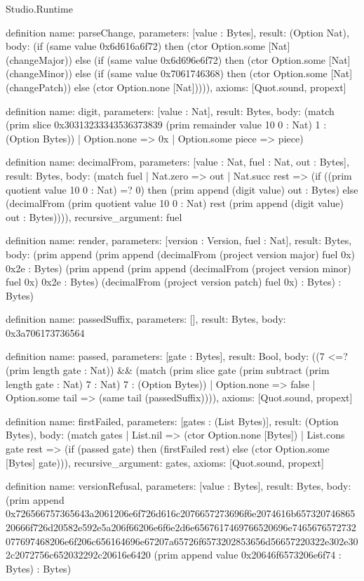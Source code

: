\begin{lexlean}{Studio.Runtime}
\begin{semanticmodule}
definition{
  name: parseChange,
  parameters: [value : Bytes],
  result: (Option Nat),
  body: (if (same value 0x6d616a6f72) then (ctor Option.some [Nat] (changeMajor)) else (if (same value 0x6d696e6f72) then (ctor Option.some [Nat] (changeMinor)) else (if (same value 0x7061746368) then (ctor Option.some [Nat] (changePatch)) else (ctor Option.none [Nat])))),
  axioms: [Quot.sound, propext]
}

definition{
  name: digit,
  parameters: [value : Nat],
  result: Bytes,
  body: (match (prim slice 0x30313233343536373839 (prim remainder value 10 0 : Nat) 1 : (Option Bytes))
    | Option.none => 0x
    | Option.some piece => piece)
}

definition{
  name: decimalFrom,
  parameters: [value : Nat, fuel : Nat, out : Bytes],
  result: Bytes,
  body: (match fuel
    | Nat.zero => out
    | Nat.succ rest => (if ((prim quotient value 10 0 : Nat) =? 0) then (prim append (digit value) out : Bytes) else (decimalFrom (prim quotient value 10 0 : Nat) rest (prim append (digit value) out : Bytes)))),
  recursive_argument: fuel
}

definition{
  name: render,
  parameters: [version : Version, fuel : Nat],
  result: Bytes,
  body: (prim append (prim append (decimalFrom (project version major) fuel 0x) 0x2e : Bytes) (prim append (prim append (decimalFrom (project version minor) fuel 0x) 0x2e : Bytes) (decimalFrom (project version patch) fuel 0x) : Bytes) : Bytes)
}

definition{
  name: passedSuffix,
  parameters: [],
  result: Bytes,
  body: 0x3a706173736564
}

definition{
  name: passed,
  parameters: [gate : Bytes],
  result: Bool,
  body: ((7 <=? (prim length gate : Nat)) && (match (prim slice gate (prim subtract (prim length gate : Nat) 7 : Nat) 7 : (Option Bytes))
    | Option.none => false
    | Option.some tail => (same tail (passedSuffix)))),
  axioms: [Quot.sound, propext]
}

definition{
  name: firstFailed,
  parameters: [gates : (List Bytes)],
  result: (Option Bytes),
  body: (match gates
    | List.nil => (ctor Option.none [Bytes])
    | List.cons gate rest => (if (passed gate) then (firstFailed rest) else (ctor Option.some [Bytes] gate))),
  recursive_argument: gates,
  axioms: [Quot.sound, propext]
}

definition{
  name: versionRefusal,
  parameters: [value : Bytes],
  result: Bytes,
  body: (prim append 0x726566757365643a2061206e6f726d616c2076657273696f6e2074616b65732074686520666f726d20582e592e5a206f66206e6f6e2d6e6567617469766520696e7465676572732077697468206e6f206c656164696e67207a65726f6573202853656d56657220322e302e302c2072756c652032292c20616e6420 (prim append value 0x20646f6573206e6f74 : Bytes) : Bytes)
}


\end{semanticmodule}
\end{lexlean}
